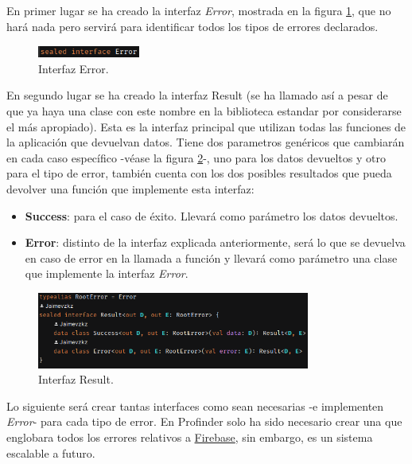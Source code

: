 En primer lugar se ha creado la interfaz \textit{Error}, mostrada en la figura \ref{fig:error_interface}, que no hará nada pero servirá para identificar todos los tipos de errores declarados.
\begin{figure}[h]
    \centering
    \includegraphics[width = 0.3\textwidth]{Imagenes/Fuentes/error_interface.png}
    \caption{Interfaz Error.}
    \label{fig:error_interface}
\end{figure}

En segundo lugar se ha creado la interfaz Result (se ha llamado así a pesar de que ya haya una clase con este nombre en la biblioteca estandar por considerarse el más apropiado). Esta es la interfaz principal que utilizan todas las funciones de la aplicación que devuelvan datos. Tiene dos parametros genéricos que cambiarán en cada caso específico -véase la figura \ref{fig:ejemplo_result}-, uno para los datos devueltos y otro para el tipo de error, también cuenta con los dos posibles resultados que pueda devolver una función que implemente esta interfaz: 
\begin{itemize}
    \item \textbf{Success}: para el caso de éxito. Llevará como parámetro los datos devueltos.
    \item \textbf{Error}: distinto de la interfaz explicada anteriormente, será lo que se devuelva en caso de error en la llamada a función y llevará como parámetro una clase que implemente la interfaz \textit{Error}.
\end{itemize}
\begin{figure}[h]
    \centering
    \includegraphics[width = 0.8\textwidth]{Imagenes/Fuentes/ejemplo_result.png}
    \caption{Interfaz Result.}
    \label{fig:ejemplo_result}
\end{figure}

Lo siguiente será crear tantas interfaces como sean necesarias -e implementen \textit{Error}- para cada tipo de error. En Profinder solo ha sido necesario crear una que englobara todos los errores relativos a \hyperlink{subsec:firebase}{Firebase}, sin embargo, es un sistema escalable a futuro.

